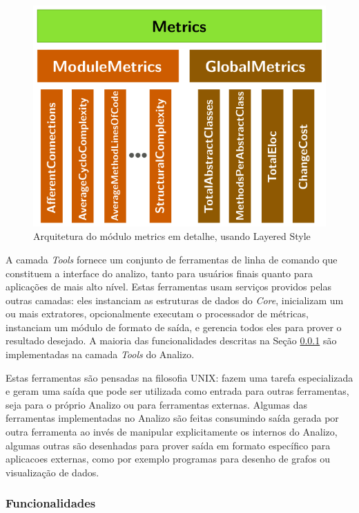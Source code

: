 \begin{figure}[H]
\center
\includegraphics[scale=0.4]{imagens/analizo-metrics-architecture.png}
\caption{Arquitetura do módulo metrics em detalhe, usando Layered Style \cite{Clements2002}}
\label{arquitetura-metrics-analizo}
\end{figure}

A camada {\it Tools} fornece um conjunto de ferramentas de linha de comando que
constituem a interface do analizo, tanto para usuários finais quanto para
aplicações de mais alto nível. Estas ferramentas usam serviços providos pelas
outras camadas: eles instanciam as estruturas de dados do {\it Core},
inicializam um ou mais extratores, opcionalmente executam o processador de
métricas, instanciam um módulo de formato de saída, e gerencia todos eles para
prover o resultado desejado. A maioria das funcionalidades descritas na Seção
\ref{funcionalidades} são implementadas na camada {\it Tools} do Analizo.

Estas ferramentas são pensadas na filosofia UNIX: fazem uma tarefa
especializada e geram uma saída que pode ser utilizada como entrada para outras
ferramentas, seja para o próprio Analizo ou para ferramentas externas. Algumas das
ferramentas implementadas no Analizo são feitas consumindo saída gerada por
outra ferramenta ao invés de manipular explicitamente os internos do Analizo,
algumas outras são desenhadas para prover saída em formato específico para
aplicacoes externas, como por exemplo programas para desenho de grafos ou
visualização de dados.

\subsubsection{Funcionalidades}\label{funcionalidades}

